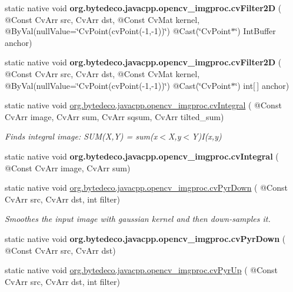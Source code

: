 \begin{DoxyCompactItemize}
static native void {\bfseries org.\+bytedeco.\+javacpp.\+opencv\+\_\+imgproc.\+cv\+Filter2D} ( @Const Cv\+Arr src, Cv\+Arr dst, @Const Cv\+Mat kernel, @By\+Val(null\+Value=\char`\"{}Cv\+Point(cv\+Point(-\/1,-\/1))\char`\"{}) @Cast(\char`\"{}Cv\+Point$\ast$\char`\"{}) Int\+Buffer anchor)
\item 
\mbox{\label{group__imgproc__c_gab159c64874a229b673570dc33f6c9634}} 
static native void {\bfseries org.\+bytedeco.\+javacpp.\+opencv\+\_\+imgproc.\+cv\+Filter2D} ( @Const Cv\+Arr src, Cv\+Arr dst, @Const Cv\+Mat kernel, @By\+Val(null\+Value=\char`\"{}Cv\+Point(cv\+Point(-\/1,-\/1))\char`\"{}) @Cast(\char`\"{}Cv\+Point$\ast$\char`\"{}) int\mbox{[}$\,$\mbox{]} anchor)
\item 
static native void \hyperlink{group__imgproc__c_ga08246108002aef3cbe4402ee61232191}{org.\+bytedeco.\+javacpp.\+opencv\+\_\+imgproc.\+cv\+Integral} ( @Const Cv\+Arr image, Cv\+Arr sum, Cv\+Arr sqsum, Cv\+Arr tilted\+\_\+sum)
\begin{DoxyCompactList}\small\item\em Finds integral image\+: S\+U\+M(\+X,\+Y) = sum(x$<$\+X,y$<$\+Y)I(x,y) \end{DoxyCompactList}\item 
\mbox{\label{group__imgproc__c_gafaec33a568938bbea8185145e2bbe1a0}} 
static native void {\bfseries org.\+bytedeco.\+javacpp.\+opencv\+\_\+imgproc.\+cv\+Integral} ( @Const Cv\+Arr image, Cv\+Arr sum)
\item 
static native void \hyperlink{group__imgproc__c_ga728d5076e2233678be83cad3203472f9}{org.\+bytedeco.\+javacpp.\+opencv\+\_\+imgproc.\+cv\+Pyr\+Down} ( @Const Cv\+Arr src, Cv\+Arr dst, int filter)
\begin{DoxyCompactList}\small\item\em Smoothes the input image with gaussian kernel and then down-\/samples it. \end{DoxyCompactList}\item 
\mbox{\label{group__imgproc__c_ga5f9b69c51b9d59156410798cbcde39c7}} 
static native void {\bfseries org.\+bytedeco.\+javacpp.\+opencv\+\_\+imgproc.\+cv\+Pyr\+Down} ( @Const Cv\+Arr src, Cv\+Arr dst)
\item 
static native void \hyperlink{group__imgproc__c_ga08b1a7b3bf0f0c133345b307e6dfa952}{org.\+bytedeco.\+javacpp.\+opencv\+\_\+imgproc.\+cv\+Pyr\+Up} ( @Const Cv\+Arr src, Cv\+Arr dst, int filter)

\end{DoxyCompactItemize}
